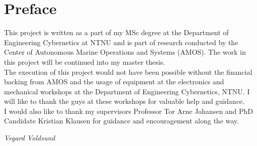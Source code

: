 \chapter*{Preface}
This project is written as a part of my MSc degree at the Department of Engineering Cybernetics at NTNU  and is part of research conducted by the Center of Autonomous Marine Operations and Systems (AMOS). The work in this project will be continued into my master thesis.\\
\newline
The execution of this project would not have been possible without the financial backing from AMOS and the usage of equipment at the electronics and mechanical workshops at the Department of Engineering Cybernetics, NTNU. I will like to thank the guys at these workshops for valuable help and guidance.\\
\newline
I would also like to thank my supervisors Professor Tor Arne Johansen and PhD Candidate Kristian Klausen for guidance and encouragement along the way.\\
\newline
\begin{flushright}
\textit{Vegard Voldsund}
\end{flushright}
